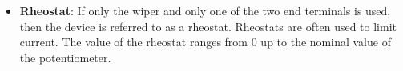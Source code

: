 \documentclass{report}
\begin{document}
\begin{itemize}
            \bigbreak \noindent 
            Finally, unlike fixed resistors, pots are available in limited sizes. Typical values use multiples of 1 or 5 for the total resistance
            \bigbreak \noindent 
            The output voltage at the wiper of a potentiometer changes because the wiper splits the total resistive track into two smaller resistor sections, and the voltage drops across each section in direct proportion to its length
        \item \textbf{Rheostat}: If only the wiper and only one of the two end terminals is used, then the device is referred to as a rheostat. Rheostats are often used to limit current. The value of the rheostat ranges from 0 up to the nominal value of the potentiometer.
            \bigbreak \noindent 
        




    \end{itemize}
\end{document}
